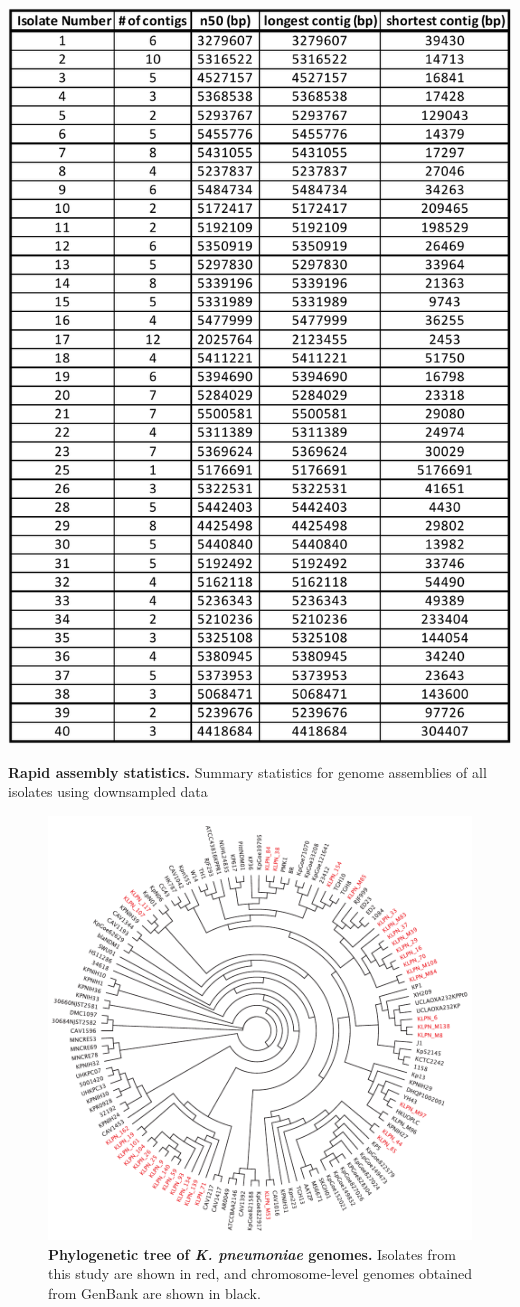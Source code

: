\begin{table}[!ht]
\centering
\includegraphics[width = .7\linewidth,keepaspectratio]{figure/asmrapid.pdf}
\caption[Rapid assembly statistics]{{\bf Rapid assembly statistics.} Summary statistics for genome assemblies of all isolates using downsampled data }
\label{tab:asmrapid}
\end{table}


\begin{figure}[!ht]
\centering
\includegraphics[width = .9\linewidth,keepaspectratio]{figure/tree.pdf}
\caption[Phylogenetic tree of \textit{K. pneumoniae} genomes]{{\bf Phylogenetic tree of \textit{K. pneumoniae} genomes.} Isolates from this study are shown in red, and chromosome-level genomes obtained from GenBank are shown in black. }
\label{fig:tree}
\end{figure}


